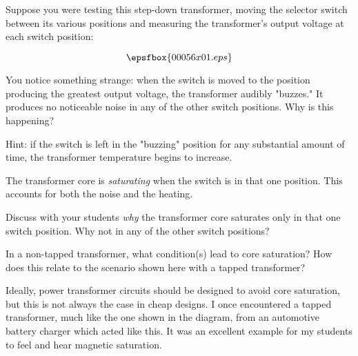 

Suppose you were testing this step-down transformer, moving the selector switch between its various positions and measuring the transformer's output voltage at each switch position:

$$\epsfbox{00056x01.eps}$$

You notice something strange: when the switch is moved to the position producing the greatest output voltage, the transformer audibly "buzzes."  It produces no noticeable noise in any of the other switch positions.  Why is this happening?

Hint: if the switch is left in the "buzzing" position for any substantial amount of time, the transformer temperature begins to increase.







The transformer core is {\it saturating} when the switch is in that one position.  This accounts for both the noise and the heating.







Discuss with your students {\it why} the transformer core saturates only in that one switch position.  Why not in any of the other switch positions?

In a non-tapped transformer, what condition(s) lead to core saturation?  How does this relate to the scenario shown here with a tapped transformer?

Ideally, power transformer circuits should be designed to avoid core saturation, but this is not always the case in cheap designs.  I once encountered a tapped transformer, much like the one shown in the diagram, from an automotive battery charger which acted like this.  It was an excellent example for my students to feel and hear magnetic saturation.





